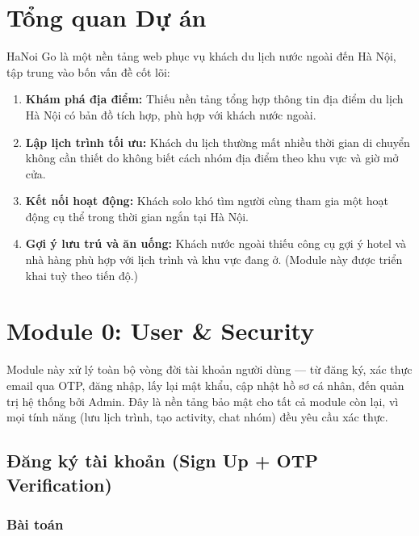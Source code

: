 \documentclass[12pt,a4paper]{article}
\begin{document}

\section{Tổng quan Dự án}

HaNoi Go là một nền tảng web phục vụ khách du lịch nước ngoài đến Hà Nội, tập
trung vào bốn vấn đề cốt lõi:

\begin{enumerate}
  \item \textbf{Khám phá địa điểm:} Thiếu nền tảng tổng hợp thông tin địa điểm
        du lịch Hà Nội có bản đồ tích hợp, phù hợp với khách nước ngoài.
  \item \textbf{Lập lịch trình tối ưu:} Khách du lịch thường mất nhiều thời gian
        di chuyển không cần thiết do không biết cách nhóm địa điểm theo khu vực
        và giờ mở cửa.
  \item \textbf{Kết nối hoạt động:} Khách solo khó tìm người cùng tham gia một
        hoạt động cụ thể trong thời gian ngắn tại Hà Nội.
  \item \textbf{Gợi ý lưu trú và ăn uống:} Khách nước ngoài thiếu công cụ gợi ý
        hotel và nhà hàng phù hợp với lịch trình và khu vực đang ở.
        (Module này được triển khai tuỳ theo tiến độ.)
\end{enumerate}

\section{Module 0: User \& Security}

Module này xử lý toàn bộ vòng đời tài khoản người dùng --- từ đăng ký, xác
thực email qua OTP, đăng nhập, lấy lại mật khẩu, cập nhật hồ sơ cá nhân, đến
quản trị hệ thống bởi Admin. Đây là nền tảng bảo mật cho tất cả module còn lại,
vì mọi tính năng (lưu lịch trình, tạo activity, chat nhóm) đều yêu cầu xác
thực.

\subsection{Đăng ký tài khoản (Sign Up + OTP Verification)}

\subsubsection{Bài toán}
\end{document}
